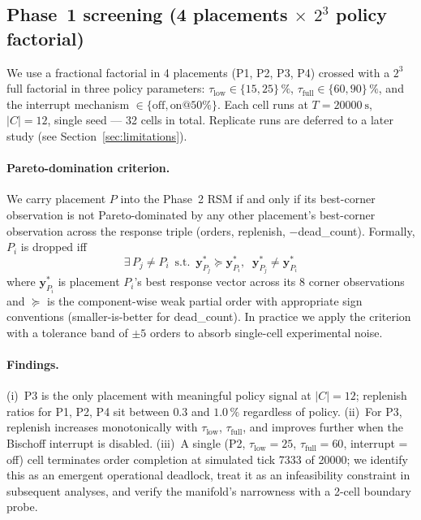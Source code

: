 \documentclass[conference]{IEEEtran}
\begin{document}
\subsection{Phase~1 screening (4 placements $\times$ $2^3$ policy factorial)}
\label{sec:phase2_screening}
We use a fractional factorial in 4 placements (P1, P2, P3, P4) crossed with a $2^3$ full factorial in three policy parameters: $\tau_\text{low} \in \{15, 25\}\,\%$, $\tau_\text{full} \in \{60, 90\}\,\%$, and the interrupt mechanism $\in \{\text{off}, \text{on@}50\%\}$. Each cell runs at $T = \SI{20000}{\second}$, $|C| = 12$, single seed --- 32 cells in total. Replicate runs are deferred to a later study (see Section~\ref{sec:limitations}).

\paragraph{Pareto-domination criterion.}
We carry placement $P$ into the Phase~2 RSM if and only if its best-corner observation is not Pareto-dominated by any other placement's best-corner observation across the response triple (orders, replenish, $-$dead\_count). Formally, $P_i$ is dropped iff
\begin{equation}
  \exists\, P_j \neq P_i \,\text{ s.t. }\, \mathbf{y}^{*}_{P_j} \succeq \mathbf{y}^{*}_{P_i},\;\;\mathbf{y}^{*}_{P_j} \neq \mathbf{y}^{*}_{P_i}
\end{equation}
where $\mathbf{y}^{*}_{P_i}$ is placement $P_i$'s best response vector across its 8 corner observations and $\succeq$ is the component-wise weak partial order with appropriate sign conventions (smaller-is-better for dead\_count). In practice we apply the criterion with a tolerance band of $\pm 5$ orders to absorb single-cell experimental noise.

\paragraph{Findings.} (i)~P3 is the only placement with meaningful policy signal at $|C| = 12$; replenish ratios for P1, P2, P4 sit between $0.3$ and $1.0\,\%$ regardless of policy. (ii)~For P3, replenish increases monotonically with $\tau_\text{low}$, $\tau_\text{full}$, and improves further when the Bischoff interrupt is disabled. (iii)~A single (P2, $\tau_\text{low} = 25$, $\tau_\text{full} = 60$, interrupt = off) cell terminates order completion at simulated tick 7333 of 20000; we identify this as an emergent operational deadlock, treat it as an infeasibility constraint in subsequent analyses, and verify the manifold's narrowness with a 2-cell boundary probe.
\end{document}
